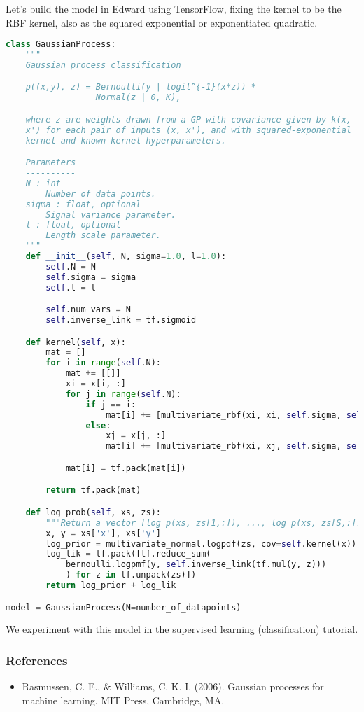 Let's build the model in Edward using TensorFlow, fixing the kernel
to be the RBF kernel, also as the squared exponential or exponentiated
quadratic.
\begin{lstlisting}[language=Python]
class GaussianProcess:
    """
    Gaussian process classification

    p((x,y), z) = Bernoulli(y | logit^{-1}(x*z)) *
                  Normal(z | 0, K),

    where z are weights drawn from a GP with covariance given by k(x,
    x') for each pair of inputs (x, x'), and with squared-exponential
    kernel and known kernel hyperparameters.

    Parameters
    ----------
    N : int
        Number of data points.
    sigma : float, optional
        Signal variance parameter.
    l : float, optional
        Length scale parameter.
    """
    def __init__(self, N, sigma=1.0, l=1.0):
        self.N = N
        self.sigma = sigma
        self.l = l

        self.num_vars = N
        self.inverse_link = tf.sigmoid

    def kernel(self, x):
        mat = []
        for i in range(self.N):
            mat += [[]]
            xi = x[i, :]
            for j in range(self.N):
                if j == i:
                    mat[i] += [multivariate_rbf(xi, xi, self.sigma, self.l)]
                else:
                    xj = x[j, :]
                    mat[i] += [multivariate_rbf(xi, xj, self.sigma, self.l)]

            mat[i] = tf.pack(mat[i])

        return tf.pack(mat)

    def log_prob(self, xs, zs):
        """Return a vector [log p(xs, zs[1,:]), ..., log p(xs, zs[S,:])]."""
        x, y = xs['x'], xs['y']
        log_prior = multivariate_normal.logpdf(zs, cov=self.kernel(x))
        log_lik = tf.pack([tf.reduce_sum(
            bernoulli.logpmf(y, self.inverse_link(tf.mul(y, z)))
            ) for z in tf.unpack(zs)])
        return log_prior + log_lik

model = GaussianProcess(N=number_of_datapoints)
\end{lstlisting}

We experiment with this model in the
\href{tut_supervised_classification.html}{supervised learning (classification)} tutorial.

\subsubsection{References}\label{references}

\begin{itemize}
\item
  Rasmussen, C. E., \& Williams, C. K. I. (2006). Gaussian processes
  for machine learning. MIT Press, Cambridge, MA.
\end{itemize}
